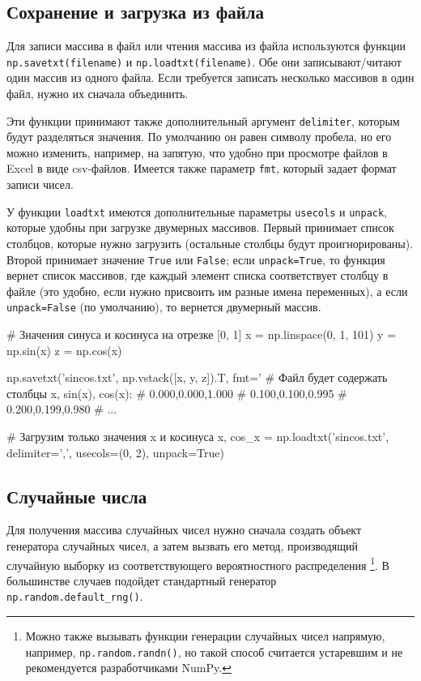 \subsection{Сохранение и загрузка из файла}
Для записи массива в файл или чтения массива из файла используются функции \verb"np.savetxt(filename)" и \verb"np.loadtxt(filename)".
Обе они записывают/читают один массив из одного файла.
Если требуется записать несколько массивов в один файл, нужно их сначала объединить. 

Эти функции принимают также дополнительный аргумент \verb"delimiter", которым будут разделяться значения. 
По умолчанию он равен символу пробела, но его можно изменить, например, на запятую, что удобно при просмотре файлов в Excel в виде csv-файлов.
Имеется также параметр \verb"fmt", который задает формат записи чисел.

У функции \verb"loadtxt" имеются дополнительные параметры \verb"usecols" и \verb"unpack", которые удобны при загрузке двумерных массивов.
Первый принимает список столбцов, которые нужно загрузить (остальные столбцы будут проигнорированы). 
Второй принимает значение \verb"True" или \verb"False"; если \verb"unpack=True", то функция вернет список массивов, где каждый элемент списка соответствует столбцу в файле (это удобно, если нужно присвоить им разные имена переменных), а если \verb"unpack=False" (по умолчанию), то вернется двумерный массив.
\begin{python}
# Значения синуса и косинуса на отрезке [0, 1]
x = np.linspace(0, 1, 101)
y = np.sin(x)
z = np.cos(x)

np.savetxt('sincos.txt', np.vstack([x, y, z]).T, fmt='%
# Файл будет содержать столбцы x, sin(x), cos(x):
# 0.000,0.000,1.000
# 0.100,0.100,0.995
# 0.200,0.199,0.980
# ...

# Загрузим только значения x и косинуса
x, cos_x = np.loadtxt('sincos.txt', delimiter=',', usecols=(0, 2), unpack=True)
\end{python}


\subsection{Случайные числа}
Для получения массива случайных чисел нужно сначала создать объект генератора случайных чисел, а затем вызвать его метод, производящий случайную выборку из соответствующего вероятностного распределения%
\footnote{Можно также вызывать функции генерации случайных чисел напрямую, например, \verb"np.random.randn()", но такой способ считается устаревшим и не рекомендуется разработчиками NumPy.}. 
В большинстве случаев подойдет стандартный генератор \verb"np.random.default_rng()".

